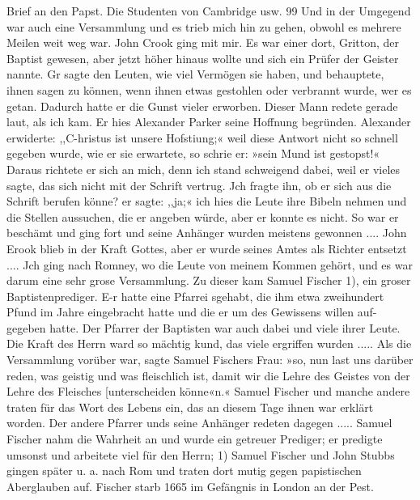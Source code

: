 Brief an den Papst. Die Studenten von Cambridge usw. 99
Und in der Umgegend war auch eine Versammlung und es trieb
mich hin zu gehen, obwohl es mehrere Meilen weit weg war.
John Crook ging mit mir. Es war einer dort, Gritton, der
Baptist gewesen, aber jetzt höher hinaus wollte und sich ein Prüfer
der Geister nannte. Gr sagte den Leuten, wie viel Vermögen
sie haben, und behauptete, ihnen sagen zu können, wenn ihnen
etwas gestohlen oder verbrannt wurde, wer es getan. Dadurch
hatte er die Gunst vieler erworben. Dieser Mann redete gerade
laut, als ich kam. Er hies Alexander Parker seine Hoffnung
begründen. Alexander erwiderte: ,,C-hristus ist unsere Hofstiung;«
weil diese Antwort nicht so schnell gegeben wurde, wie er sie
erwartete, so schrie er: »sein Mund ist gestopst!« Daraus richtete
er sich an mich, denn ich stand schweigend dabei, weil er vieles
sagte, das sich nicht mit der Schrift vertrug. Jch fragte ihn,
ob er sich aus die Schrift berufen könne? er sagte: ,,ja;« ich hies
die Leute ihre Bibeln nehmen und die Stellen aussuchen, die
er angeben würde, aber er konnte es nicht. So war er beschämt
und ging fort und seine Anhänger wurden meistens gewonnen ....
John Erook blieb in der Kraft Gottes, aber er wurde seines
Amtes als Richter entsetzt ....
Jch ging nach Romney, wo die Leute von meinem Kommen
gehört, und es war darum eine sehr grose Versammlung. Zu
dieser kam Samuel Fischer 1), ein groser Baptistenprediger. E-r
hatte eine Pfarrei sgehabt, die ihm etwa zweihundert Pfund im
Jahre eingebracht hatte und die er um des Gewissens willen auf-
gegeben hatte. Der Pfarrer der Baptisten war auch dabei und
viele ihrer Leute. Die Kraft des Herrn ward so mächtig kund,
das viele ergriffen wurden ..... Als die Versammlung vorüber
war, sagte Samuel Fischers Frau: »so, nun last uns darüber
reden, was geistig und was fleischlich ist, damit wir die Lehre
des Geistes von der Lehre des Fleisches [unterscheiden könne«n.«
Samuel Fischer und manche andere traten für das Wort des
Lebens ein, das an diesem Tage ihnen war erklärt worden. Der
andere Pfarrer unds seine Anhänger redeten dagegen .....
Samuel Fischer nahm die Wahrheit an und wurde ein getreuer
Prediger; er predigte umsonst und arbeitete viel für den Herrn;
1) Samuel Fischer und John Stubbs gingen später u. a. nach Rom und
traten dort mutig gegen papistischen Aberglauben auf. Fischer starb 1665 im
Gefängnis in London an der Pest.
 
